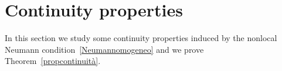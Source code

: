 \documentclass[12pt,a4paper,intlimits,sumlimits]{amsart}
\def \Q {\mathcal Q}
\theoremstyle{definition}
\theoremstyle{plain}
\numberwithin{equation}{section}
\renewcommand{\leq}{\leqslant}
\begin{document}
%
%

\section{Continuity properties}\label{KDMCLDFMVV3}

In this section we study some continuity properties induced by the 
nonlocal Neumann condition~\eqref{Neumannomogeneo} and we prove
Theorem~\ref{propcontinuità}.
\end{document}
